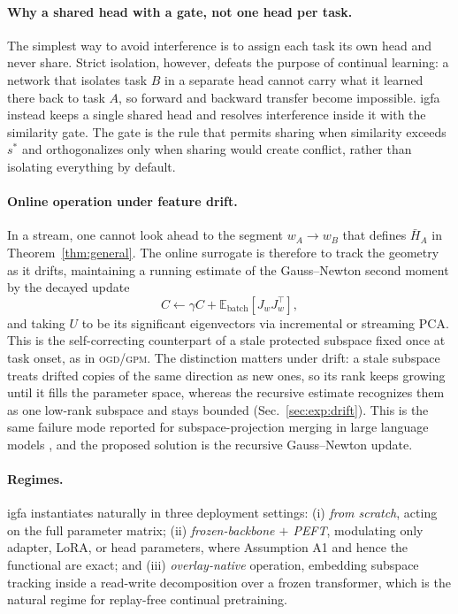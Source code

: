 \documentclass[10pt,a4paper]{article}
\theoremstyle{plain}
\theoremstyle{definition}
\newcommand{\sstar}{s^{\ast}}
\newcommand{\IGFA}{igfa}
\newcommand{\OGD}{\textsc{ogd}}
\begin{document}
\paragraph{Why a shared head with a gate, not one head per task.} The simplest way to
avoid interference is to assign each task its own head and never share. Strict
isolation, however, defeats the purpose of continual learning: a network that isolates task
$B$ in a separate head cannot carry what it learned there back to task $A$, so forward and
backward transfer become impossible. \IGFA{} instead keeps a single shared head and
resolves interference inside it with the similarity gate. The gate is the rule that
permits sharing when similarity exceeds $\sstar$ and orthogonalizes only when sharing
would create conflict, rather than isolating everything by default.

\paragraph{Online operation under feature drift.} In a stream, one cannot look ahead to
the segment $w_A\!\to\!w_B$ that defines $\bar H_A$ in Theorem~\ref{thm:general}. The
online surrogate is therefore to track the geometry as it drifts, maintaining a running
estimate of the Gauss--Newton second moment by the decayed update
\begin{equation}
C\leftarrow\gamma C+\mathbb{E}_{\text{batch}}[J_w J_w^\top],
\label{eq:gn-update}
\end{equation}
and taking $U$ to be its significant eigenvectors via incremental or streaming PCA.
This is the self-correcting counterpart of a stale protected subspace fixed once at
task onset, as in \OGD{}/\textsc{gpm}. The distinction matters under drift: a stale
subspace treats drifted copies of the same direction as new ones, so its rank keeps
growing until it fills the parameter space, whereas the recursive estimate recognizes
them as one low-rank subspace and stays bounded (Sec.~\ref{sec:exp:drift}). This is the same
failure mode reported for subspace-projection merging in large language models
\cite{merging2025llm}, and the proposed solution is the recursive Gauss--Newton update.

\paragraph{Regimes.} \IGFA{} instantiates naturally in three deployment settings:
(i) \emph{from scratch}, acting on the full parameter matrix; (ii) \emph{frozen-backbone
$+$ PEFT}, modulating only adapter, LoRA, or head parameters, where Assumption A1 and
hence the functional are exact; and (iii) \emph{overlay-native} operation, embedding
subspace tracking inside a read-write decomposition over a frozen transformer, which is
the natural regime for replay-free continual pretraining.
\end{document}
